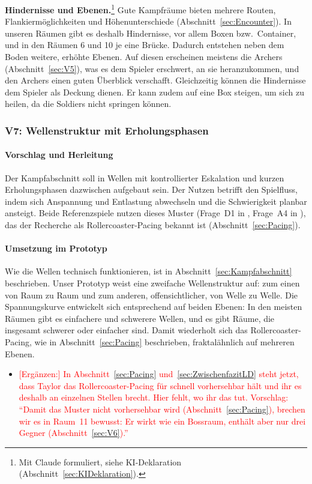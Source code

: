 \documentclass[../Main.tex]{subfiles}
\begin{document}
\textbf{Hindernisse und Ebenen.}\footnote{Mit Claude formuliert, siehe KI-Deklaration (Abschnitt~\ref{sec:KIDeklaration}).} Gute Kampfräume bieten mehrere Routen, Flankiermöglichkeiten und Höhenunterschiede (Abschnitt~\ref{sec:Encounter}). In unseren Räumen gibt es deshalb Hindernisse, vor allem Boxen bzw.\ Container, und in den Räumen 6 und 10 je eine Brücke. Dadurch entstehen neben dem Boden weitere, erhöhte Ebenen. Auf diesen erscheinen meistens die Archers (Abschnitt~\ref{sec:V5}), was es dem Spieler erschwert, an sie heranzukommen, und den Archers einen guten Überblick verschafft. Gleichzeitig können die Hindernisse dem Spieler als Deckung dienen. Er kann zudem auf eine Box steigen, um sich zu heilen, da die Soldiers nicht springen können.

\subsubsection{V7: Wellenstruktur mit Erholungsphasen} \label{sec:V7}

\paragraph{Vorschlag und Herleitung}
Der Kampfabschnitt soll in Wellen mit kontrollierter Eskalation und kurzen Erholungsphasen dazwischen aufgebaut sein. Der Nutzen betrifft den Spielfluss, indem sich Anspannung und Entlastung abwechseln und die Schwierigkeit planbar ansteigt. Beide Referenzspiele nutzen dieses Muster (Frage~D1 in , Frage~A4 in ), das der Recherche als Rollercoaster-Pacing bekannt ist (Abschnitt~\ref{sec:Pacing}).

\paragraph{Umsetzung im Prototyp}
Wie die Wellen technisch funktionieren, ist in Abschnitt~\ref{sec:Kampfabschnitt} beschrieben. Unser Prototyp weist eine zweifache Wellenstruktur auf: zum einen von Raum zu Raum und zum anderen, offensichtlicher, von Welle zu Welle. Die Spannungskurve entwickelt sich entsprechend auf beiden Ebenen: In den meisten Räumen gibt es einfachere und schwerere Wellen, und es gibt Räume, die insgesamt schwerer oder einfacher sind. Damit wiederholt sich das Rollercoaster-Pacing, wie in Abschnitt~\ref{sec:Pacing} beschrieben, fraktalähnlich auf mehreren Ebenen.

\begin{itemize}[leftmargin=1.5cm]
    \item \textcolor{red}{[Ergänzen:] In Abschnitt~\ref{sec:Pacing} und~\ref{sec:ZwischenfazitLD} steht jetzt, dass Taylor das Rollercoaster-Pacing für schnell vorhersehbar hält und ihr es deshalb an einzelnen Stellen brecht. Hier fehlt, wo ihr das tut. Vorschlag: \enquote{Damit das Muster nicht vorhersehbar wird (Abschnitt~\ref{sec:Pacing}), brechen wir es in Raum~11 bewusst: Er wirkt wie ein Bossraum, enthält aber nur drei Gegner (Abschnitt~\ref{sec:V6}).}}
\end{itemize}
\end{document}
